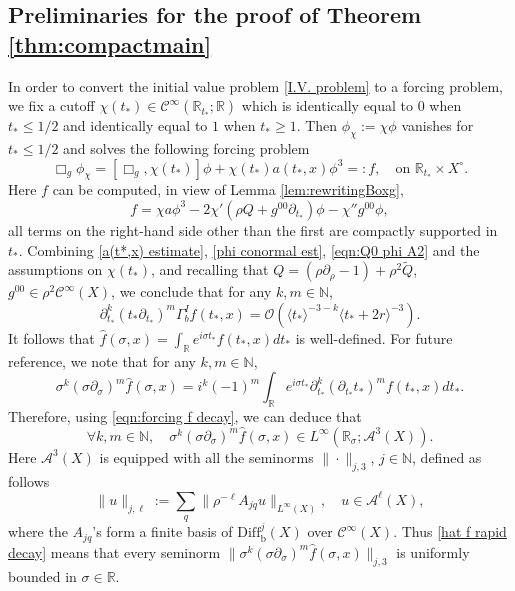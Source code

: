 \documentclass[10pt,a4paper,reqno]{amsart}
\newcommand{\CI}{\mathcal{C}^\infty}
\newcommand{\RR}{\mathbb{R}}
\newcommand{\NN}{\mathbb{N}}
\newcommand{\A}{\mathcal{A}}
\newcommand{\pa}{\partial}
\newcommand{\la}{\langle}
\newcommand{\ra}{\rangle}
\theoremstyle{definition}
\theoremstyle{remark}
\numberwithin{equation}{section}
\newcommand{\R}{\mathbb R}
\newcommand{\ts}{t_*}
\newcommand{\Diffb}{\mathrm{Diff}_\mathrm{b}}
\newcommand{\wh}{\widehat}
\newcommand{\pats}{\pa_{t_*}}
\begin{document}
\subsection{Preliminaries for the proof of Theorem \ref{thm:compactmain}}
\label{subsection:Preliminaries for spatially compact asymp}
In order to convert the initial value problem \eqref{I.V. problem} to a forcing problem, we fix a cutoff $\chi(\ts)\in \CI(\RR_{\ts};\RR)$ which is identically equal to $0$ when $\ts\leq 1/2$ and identically equal to
$1$ when $\ts\geq 1$. Then $\phi_\chi := \chi\phi$ vanishes for $\ts\leq 1/2$ and solves the following forcing problem 
\begin{equation}
\label{forcing problem}
	\Box_g \phi_\chi = [\Box_g , \chi(\ts)]\phi + \chi(\ts)a(\ts,x)\phi^3 =: f,\quad \textrm{on }\RR_{\ts}\times X^\circ.
\end{equation}
Here $f$ can be computed, in view of Lemma \ref{lem:rewritingBoxg},
\begin{equation}
\label{the forcing f}
    f = \chi a\phi^3 - 2\chi'(\rho Q + g^{00}\pats)\phi - \chi'' g^{00} \phi,
\end{equation}
all terms on the right-hand side other than the first are compactly supported in $\ts$. Combining \eqref{a(t*,x) estimate}, \eqref{phi conormal est}, \eqref{eqn:Q0 phi A2} and the assumptions on $\chi(\ts)$, and recalling that $Q=(\rho\pa_{\rho}-1)+\rho^2 \widetilde{Q}$, $g^{00}\in \rho^2\CI(X)$, we conclude that for any $k,m\in\mathbb{N}$,
\begin{equation}
\label{eqn:forcing f decay}
	\pa_{t_*}^k(\ts\pa_{t_*})^m \Gamma_b^I f(\ts,x) = \mathcal{O}(\la t_*\ra^{-3-k} \la t_*+2r\ra^{-3}).
\end{equation}
It follows that $\wh{f}(\sigma,x) = \int_\RR e^{i\sigma \ts} f(\ts,x) d\ts$ is well-defined. For future reference, we note that for any $k,m\in\mathbb{N}$,
\[
	\sigma^k (\sigma\pa_\sigma)^m \wh{f}(\sigma,x) = i^k (-1)^m \int_\RR e^{i\sigma\ts} \pa_{\ts}^k (\pa_{\ts} \ts)^m f(\ts,x) d\ts.
\]
Therefore, using \eqref{eqn:forcing f decay}, we can deduce that
\begin{equation}
\label{hat f rapid decay}
	\forall k,m\in\mathbb{N},\quad \sigma^k(\sigma\pa_\sigma)^m \widehat{f}(\sigma,x) \in L^{\infty}(\R_\sigma; \A^3(X)).
\end{equation}
Here $\A^3(X)$ is equipped with all the seminorms $\|\cdot\|_{j,3}$, $j\in\NN$, defined as follows
\begin{equation}
\label{seminorms on A ell}
	\|u\|_{j,\ell} := \sum_{q} \|\rho^{-\ell} A_{jq}u\|_{L^\infty(X)},\quad u\in \A^\ell(X),
\end{equation}
where the $A_{jq}$'s form a finite basis of $\Diffb^j(X)$ over $\CI(X)$. Thus \eqref{hat f rapid decay} means that every seminorm $\|\sigma^k(\sigma\pa_\sigma)^m \widehat{f}(\sigma,x)\|_{j,3}$ is uniformly bounded in $\sigma\in\RR$.
\end{document}
